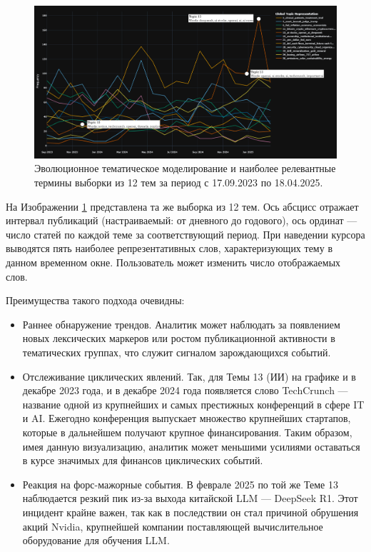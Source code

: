 \begin{figure}[H]
    \centering
    \includegraphics[width=1\linewidth]{img/dynamic_topic_modeling.png}
    \caption{Эволюционное тематическое моделирование и наиболее релевантные термины выборки из 12 тем за период с 17.09.2023 по 18.04.2025.}
    \label{fig:dtm}
\end{figure}

На Изображении \ref{fig:dtm} представлена та же выборка из 12 тем. Ось абсцисс отражает интервал публикаций (настраиваемый:
от дневного до годового), ось ординат --- число статей по каждой теме за соответствующий период. При наведении
курсора выводятся пять наиболее репрезентативных слов, характеризующих тему в данном временном окне. Пользователь может
изменить число отображаемых слов.

Преимущества такого подхода очевидны:

\begin{itemize}
    \item Раннее обнаружение трендов. Аналитик может наблюдать за появлением новых лексических маркеров
    или ростом публикационной активности в тематических группах, что служит сигналом зарождающихся событий.
    \item Отслеживание циклических явлений. Так, для Темы 13 (ИИ) на графике и в декабре 2023 года,
    и в декабре 2024 года появляется слово TechCrunch — название одной из крупнейших и самых престижных
    конференций в сфере IT и AI. Ежегодно конференция выпускает множество крупнейших стартапов, которые
    в дальнейшем получают крупное финансирования. Таким образом, имея данную визуализацию, аналитик может
    меньшими усилиями оставаться в курсе значимых для финансов циклических событий.
    \item Реакция на форс-мажорные события. В феврале 2025 по той же Теме 13 наблюдается резкий пик из-за
    выхода китайской LLM --- DeepSeek R1. Этот инцидент крайне важен, так как в последствии он стал причиной обрушения
    акций Nvidia, крупнейшей компании поставляющей вычислительное оборудование для обучения LLM.
\end{itemize}

